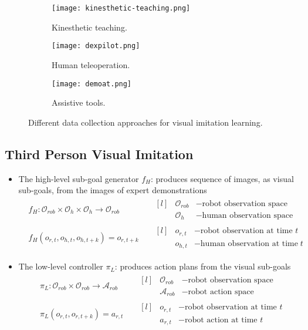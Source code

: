 \begin{figure}[hbt!]
	\centering
	\begin{subfigure}[b]{0.25\textwidth}
		\centering
		\texttt{[image: kinesthetic-teaching.png]}
		\caption{Kinesthetic teaching. \cite{tykal2016incrementally}}
	\end{subfigure}
	\hfill
	\begin{subfigure}[b]{0.4\textwidth}
		\centering
		\texttt{[image: dexpilot.png]}
		\caption{Human teleoperation. \cite{handa2020dexpilot}}
	\end{subfigure}
	\hfill
	\begin{subfigure}[b]{0.3\textwidth}
		\centering
		\texttt{[image: demoat.png]}
		\caption{Assistive tools. \cite{young2020visual}}
	\end{subfigure}
	\caption{Different data collection approaches for visual imitation learning.}
\end{figure}

\subsection{Third Person Visual Imitation}
\begin{itemize}
	\item The high-level sub-goal generator $ f_{H} $: produces sequence of images, as visual sub-goals, from the images of expert demonstrations
	\begin{align}
		&f_{H}: \mathcal{O}_{rob} \times \mathcal{O}_{h} \times \mathcal{O}_{h} \rightarrow \mathcal{O}_{rob} && \begin{matrix*}[l]
			&\mathcal{O}_{rob} &- \text{robot observation space}\\
			&\mathcal{O}_{h} &- \text{human observation space}
		\end{matrix*}\\
		&f_{H}(o_{r,t}, o_{h,t}, o_{h,t+k}) = o_{r,t+k} && \begin{matrix*}[l]
			&o_{r,t} &- \text{robot observation at time $t$}\\
			&o_{h,t} &- \text{human observation at time $t$}
		\end{matrix*}
	\end{align}
	\item The low-level controller $ \pi_{L} $: produces action plans from the visual sub-goals
	\begin{align}
		&\pi_{L}: \mathcal{O}_{rob} \times \mathcal{O}_{rob} \rightarrow \mathcal{A}_{rob} && \begin{matrix*}[l]
			&\mathcal{O}_{rob} &- \text{robot observation space}\\
			&\mathcal{A}_{rob} &- \text{robot action space}
		\end{matrix*}\\
		&\pi_{L}(o_{r,t}, o_{r,t+k}) = a_{r,t} && \begin{matrix*}[l]
			&o_{r,t} &- \text{robot observation at time $t$}\\
			&a_{r,t} &- \text{robot action at time $t$}
		\end{matrix*}
	\end{align}
\end{itemize}

